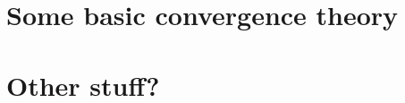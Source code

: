 \documentclass[18pt,xcolor=table]{beamer}
\begin{document}

\section{Some basic convergence theory}




\section{Other stuff?}





\begin{frame}{}
\begin{block}{}
\bit
\item 
\eit
\end{block}
\end{frame}



\end{document}

